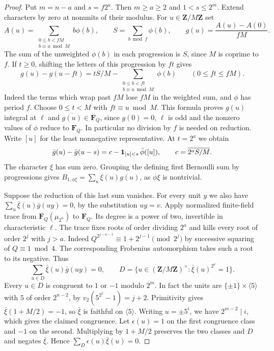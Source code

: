 \begin{proof}
Put \(m=n-a\) and \(s=f2^a\). Then \(m\ge a\ge2\) and
\(1<s\le2^m\). Extend characters by zero at nonunits of their modulus.
For \(u\in\mathbf Z/M\mathbf Z\) set
\[
 A(u)=\sum_{\substack{0\le b<fM\\ b\equiv u\bmod M}} b\phi(b),
 \qquad S=\sum_{b\bmod f}\phi(b),\qquad
 g(u)=\frac{A(u)-A(0)}{fM}.
\]
The sum of the unweighted \(\phi(b)\) in each progression is \(S\),
since \(M\) is coprime to \(f\). If \(t\ge0\), shifting the letters
of this progression by \(ft\) gives
\[
 g(u)-g(u-ft)=tS/M-
       \sum_{\substack{0\le b<ft\\b\equiv u\bmod M}}\phi(b)
       \qquad(0\le ft\le fM).
\]
Indeed the terms which wrap past \(fM\) lose \(fM\) in the weighted
sum, and \(\phi\) has period \(f\). Choose \(0\le t<M\) with
\(ft\equiv u\bmod M\). This formula proves \(g(u)\) integral at \(\ell\)
and \(\overline{g(u)}\in\mathbf F_Q\), since \(g(0)=0\), \(\ell\)
is odd and the nonzero values of \(\phi\) reduce to \(\mathbf F_Q\).
In particular no division by \(f\) is needed on reduction.
Write \([u]\) for the least nonnegative representative. At \(t=2^a\)
we obtain
\[
 \bar g(u)-\bar g(u-s)=c-{\bf1}_{[u]<s}\,\bar\phi([u]),
 \qquad c=\overline{2^a S/M}.
\]
The character \(\xi\) has sum zero. Grouping the defining first
Bernoulli sum by progressions gives
\(B_{1,\phi\xi}=\sum_u\xi(u)g(u)\), as \(\phi\xi\) is nontrivial.

Suppose the reduction of this last sum vanishes. For every unit \(y\)
we also have \(\sum_u\bar\xi(u)\bar g(uy)=0\), by the substitution
\(uy=v\). Apply normalized finite-field trace from
\(\mathbf F_Q(\mu_{2^n})\) to \(\mathbf F_Q\). Its degree is a power
of two, invertible in characteristic \(\ell\). The trace fixes roots
of order dividing \(2^a\) and kills every root of order \(2^j\)
with \(j>a\). Indeed \(Q^{2^{j-a-1}}\equiv1+2^{j-1}\pmod{2^j}\)
by successive squaring of \(Q\equiv1\bmod4\). The corresponding
Frobenius automorphism takes such a root to its negative. Thus
\[
 \sum_{u\in D}\bar\xi(u)\bar g(uy)=0,\qquad
 D=\{u\in(\mathbf Z/M\mathbf Z)^\times:\bar\xi(u)^{2^a}=1\}.
\]
Every \(u\in D\) is congruent to \(1\) or \(-1\) modulo \(2^m\).
In fact the units are \(\{\pm1\}\times\langle5\rangle\) with
\(5\) of order \(2^{n-2}\), by \(v_2(5^{2^j}-1)=j+2\).
Primitivity gives \(\bar\xi(1+M/2)=-1\), so \(\bar\xi\) is faithful
on \(\langle5\rangle\). Writing \(u=\pm5^i\), we have
\(2^{m-2}\mid i\), which gives the claimed congruence.
Let \(\epsilon(u)=1\) on the first congruence class and \(-1\)
on the second. Multiplying by \(1+M/2\) preserves the two classes
and \(D\) and negates \(\bar\xi\). Hence
\(\sum_D\epsilon(u)\bar\xi(u)=0\).


\end{proof}
